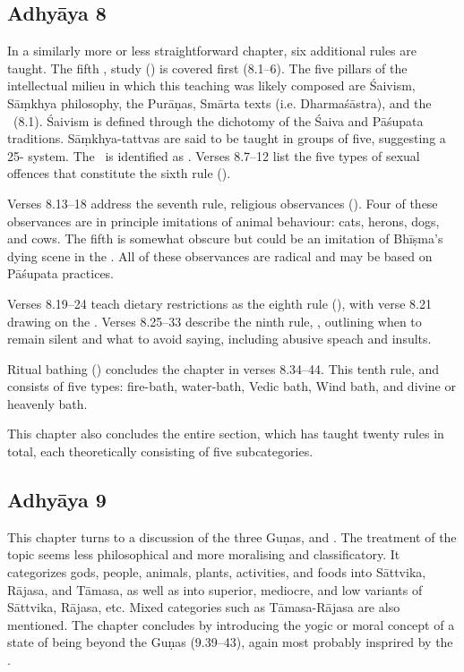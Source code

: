 \subsection{Adhyāya 8}\label{contents_of_ch08}
In a similarly more or less straightforward chapter, six additional 
 rules are taught. The fifth , study () 
is covered first (8.1--6). The five pillars of the intellectual
milieu in which this teaching was likely composed are
Śaivism, Sāṃkhya philosophy, the Purāṇas, Smārta texts (i.e. Dharmaśāstra),
and the \MBh\ (8.1). Śaivism is defined through the dichotomy of the Śaiva and Pāśupata
traditions. Sāṃkhya-tattvas are said to be taught in groups of five,
suggesting a 25- system. The \MBh\ is identified as . 
Verses 8.7--12 list the five types of sexual offences that constitute
the sixth  rule ().

Verses 8.13--18 address the seventh  rule, religious
observances (). Four of these observances are in principle imitations of 
animal behaviour: cats, herons, dogs, and cows. The fifth is
somewhat obscure but could be an imitation of Bhīṣma's dying scene in the 
\MBh. All of these observances are radical and may be based on Pāśupata practices.

Verses 8.19--24 teach dietary restrictions as the eighth  rule (),
 with verse 8.21 drawing on the \MBh.
Verses 8.25--33 describe the ninth  rule, , outlining
when to remain silent and what to avoid saying, including abusive speach and
insults.

Ritual bathing () concludes the chapter in verses 8.34--44. This 
tenth  rule, and consists of five types: fire-bath, water-bath, Vedic bath,
Wind bath, and divine or heavenly bath.  

This chapter also concludes the entire  section, which has
taught twenty rules in total, each theoretically consisting of five subcategories.




\subsection{Adhyāya 9}\label{contents_of_ch09}
This chapter turns to a discussion of the three Guṇas,  and .
The treatment of the topic seems less philosophical and more moralising and classificatory.
It categorizes gods, people, animals, plants, activities, and foods into Sāttvika, Rājasa, and Tāmasa, as well as into superior, mediocre, and low variants of Sāttvika, Rājasa, etc. Mixed categories such as Tāmasa-Rājasa are also mentioned. The chapter concludes by introducing the yogic or moral concept of a state of being beyond the Guṇas (9.39--43), again most probably insprired by the \MBH.

